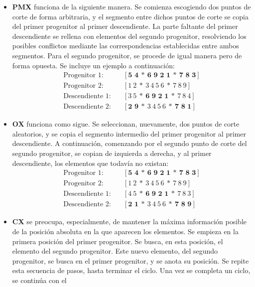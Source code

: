 \begin{itemize}
  \item \textbf{\ac{PMX}} funciona de la siguiente manera. Se comienza escogiendo dos puntos de corte de forma arbitraria, y el
  segmento entre dichos puntos de corte se copia del primer progenitor al primer descendiente. La parte faltante del primer 
  descendiente se rellena con elementos del segundo progenitor, resolviendo los posibles conflictos mediante las correspondencias
  establecidas entre ambos segmentos. Para el segundo progenitor, se procede de igual manera pero de forma opuesta. Se incluye un
  ejemplo a continuación:
  \begin{align*}
    \text{Progenitor 1:}   &\quad [\textbf{5\ 4}\ * \ \textbf{6\ 9\ 2\ 1}\ *\ \textbf{7\ 8\ 3}] \\
    \text{Progenitor 2:}   &\quad [1\ 2\ *\ 3\ 4\ 5\ 6\ *\ 7\ 8\ 9] \\[1em]
    \text{Descendiente 1:} &\quad [3\ 5\ *\ \textbf{6\ 9\ 2\ 1}\ *\ 7\ 8\ 4] \\
    \text{Descendiente 2:} &\quad [\textbf{2\ 9}\ *\ 3\ 4\ 5\ 6\ *\ \textbf{7\ 8\ 1}]
  \end{align*}
  \item \textbf{\ac{OX}} funciona como sigue. Se seleccionan, nuevamente, dos puntos de corte aleatorios, y se copia el 
  segmento intermedio del primer progenitor al primer descendiente. A continuación, comenzando por el segundo punto de corte
  del segundo progenitor, se copian de izquierda a derecha, y al primer descendiente, los elementos que todavía no existan:
  \begin{align*}
    \text{Progenitor 1:}   &\quad [\textbf{5\ 4}\ * \ \textbf{6\ 9\ 2\ 1}\ *\ \textbf{7\ 8\ 3}] \\
    \text{Progenitor 2:}   &\quad [1\ 2\ *\ 3\ 4\ 5\ 6\ *\ 7\ 8\ 9] \\[1em]
    \text{Descendiente 1:} &\quad [4\ 5\ *\ \textbf{6\ 9\ 2\ 1}\ *\ 7\ 8\ 3] \\
    \text{Descendiente 2:} &\quad [\textbf{2\ 1}\ *\ 3\ 4\ 5\ 6\ *\ \textbf{7\ 8\ 9}]
  \end{align*}
  \item \textbf{\ac{CX}} se preocupa, especialmente, de mantener la máxima información posible de la posición absoluta en
  la que aparecen los elementos. Se empieza en la primera posición del primer progenitor. Se busca, en esta posición, el
  elemento del segundo progenitor. Este nuevo elemento, del segundo progenitor, se busca en el primer progenitor, y se anota
  su posición. Se repite esta secuencia de pasos, hasta terminar el ciclo. Una vez se completa un ciclo, se continúa con el

\end{itemize}
